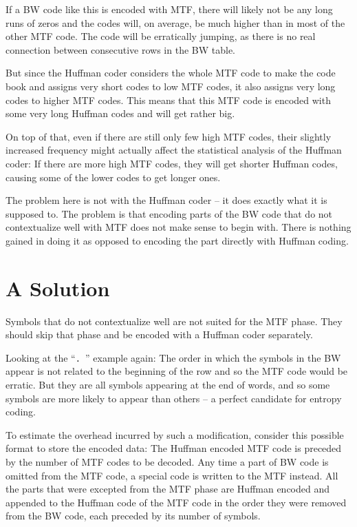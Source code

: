 \documentclass[a4paper]{scrreprt}
\begin{document}
If a BW code like this is encoded with MTF, there will likely not be any long
runs of zeros and the codes will, on average, be much higher than in most of the
other MTF code. The code will be erratically jumping, as there is no real
connection between consecutive rows in the BW table.

But since the Huffman coder considers the whole MTF code to make the code
book and assigns very short codes to low MTF codes, it also assigns very long
codes to higher MTF codes. This means that this MTF code is encoded with some
very long Huffman codes and will get rather big.

On top of that, even if there are still only few high MTF codes, their slightly
increased frequency might actually affect the statistical analysis of the
Huffman coder: If there are more high MTF codes, they will get shorter Huffman
codes, causing some of the lower codes to get longer ones.

The problem here is not with the Huffman coder -- it does exactly what it is
supposed to. The problem is that encoding parts of the BW code that do not
contextualize well with MTF does not make sense to begin with. There is nothing
gained in doing it as opposed to encoding the part directly with Huffman coding.

\section{A Solution}

Symbols that do not contextualize well are not suited for the MTF phase. They
should skip that phase and be encoded with a Huffman coder separately.

Looking at the ``\texttt{. }'' example again: The order in which the symbols in
the BW appear is not related to the beginning of the row and so the MTF code
would be erratic. But they are all symbols appearing at the end of words, and so
some symbols are more likely to appear than others -- a perfect candidate for
entropy coding.

To estimate the overhead incurred by such a modification, consider this possible
format to store the encoded data: The Huffman encoded MTF code is preceded by
the number of MTF codes to be decoded. Any time a part of BW code is omitted
from the MTF code, a special code is written to the MTF instead. All the parts
that were excepted from the MTF phase are Huffman encoded and appended to the
Huffman code of the MTF code in the order they were removed from the BW code,
each preceded by its number of symbols.
\end{document}
